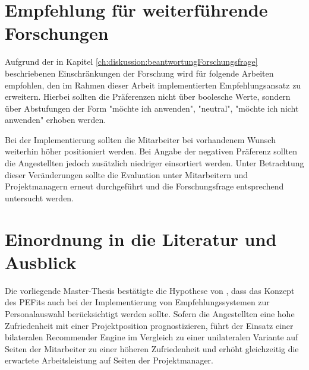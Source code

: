 \section{Empfehlung für weiterführende Forschungen}
\label{ch:diskussion:empfehlung}
Aufgrund der in Kapitel \ref{ch:diskussion:beantwortungForschungsfrage} beschriebenen Einschränkungen der Forschung wird für folgende Arbeiten empfohlen, den im Rahmen dieser Arbeit implementierten Empfehlungsansatz zu erweitern. Hierbei sollten die Präferenzen nicht über boolesche Werte, sondern über Abstufungen der Form "möchte ich anwenden", "neutral", "möchte ich nicht anwenden" erhoben werden.

Bei der Implementierung sollten die Mitarbeiter bei vorhandenem Wunsch weiterhin höher positioniert werden. Bei Angabe der negativen Präferenz sollten die Angestellten jedoch zusätzlich niedriger einsortiert werden. Unter Betrachtung dieser Veränderungen sollte die Evaluation unter Mitarbeitern und Projektmanagern erneut durchgeführt und die Forschungsfrage entsprechend untersucht werden.

\section{Einordnung in die Literatur und Ausblick}
\label{ch:diskussion:einordnung}
Die vorliegende Master-Thesis bestätigte die Hypothese von \textcite{malinowski:2008}, dass das Konzept des \acp{PEFit} auch bei der Implementierung von Empfehlungssystemen zur Personalauswahl berücksichtigt werden sollte. Sofern die Angestellten eine hohe Zufriedenheit mit einer Projektposition prognostizieren, führt der Einsatz einer bilateralen Recommender Engine im Vergleich zu einer unilateralen Variante auf Seiten der Mitarbeiter zu einer höheren Zufriedenheit und erhöht gleichzeitig die erwartete Arbeitsleistung auf Seiten der Projektmanager. 
